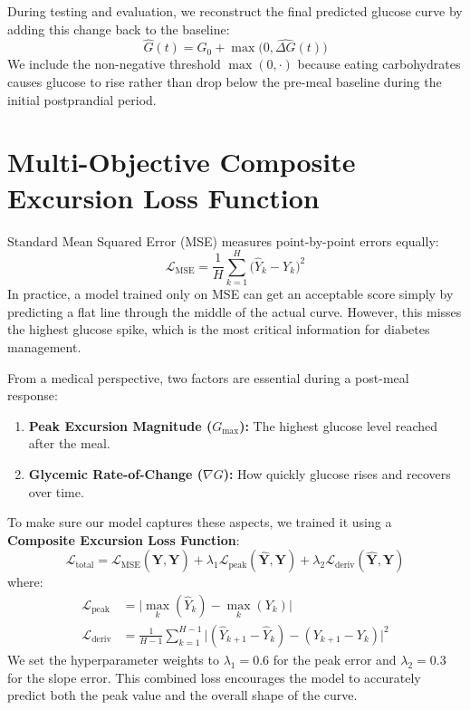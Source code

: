 During testing and evaluation, we reconstruct the final predicted glucose curve by adding this change back to the baseline:
\begin{equation}
    \hat{G}(t) = G_0 + \max\Big(0, \hat{\Delta G}(t)\Big)
\end{equation}
We include the non-negative threshold $\max(0, \cdot)$ because eating carbohydrates causes glucose to rise rather than drop below the pre-meal baseline during the initial postprandial period.

\section{Multi-Objective Composite Excursion Loss Function}
Standard Mean Squared Error (MSE) measures point-by-point errors equally:
\begin{equation}
    \mathcal{L}_{\text{MSE}} = \frac{1}{H} \sum_{k=1}^{H} \big(\hat{Y}_k - Y_k\big)^2
\end{equation}
In practice, a model trained only on MSE can get an acceptable score simply by predicting a flat line through the middle of the actual curve. However, this misses the highest glucose spike, which is the most critical information for diabetes management.

From a medical perspective, two factors are essential during a post-meal response:
\begin{enumerate}
    \item \textbf{Peak Excursion Magnitude ($G_{\max}$):} The highest glucose level reached after the meal.
    \item \textbf{Glycemic Rate-of-Change ($\nabla G$):} How quickly glucose rises and recovers over time.
\end{enumerate}

To make sure our model captures these aspects, we trained it using a \textbf{Composite Excursion Loss Function}:
\begin{equation}
    \mathcal{L}_{\text{total}} = \mathcal{L}_{\text{MSE}}(\hat{\mathbf{Y}}, \mathbf{Y}) + \lambda_1 \mathcal{L}_{\text{peak}}(\hat{\mathbf{Y}}, \mathbf{Y}) + \lambda_2 \mathcal{L}_{\text{deriv}}(\hat{\mathbf{Y}}, \mathbf{Y})
\end{equation}
where:
\begin{align}
    \mathcal{L}_{\text{peak}} &= \Big| \max_{k}(\hat{Y}_k) - \max_{k}(Y_k) \Big| \\
    \mathcal{L}_{\text{deriv}} &= \frac{1}{H-1} \sum_{k=1}^{H-1} \Big| (\hat{Y}_{k+1} - \hat{Y}_k) - (Y_{k+1} - Y_k) \Big|^2
\end{align}
We set the hyperparameter weights to $\lambda_1 = 0.6$ for the peak error and $\lambda_2 = 0.3$ for the slope error. This combined loss encourages the model to accurately predict both the peak value and the overall shape of the curve.

